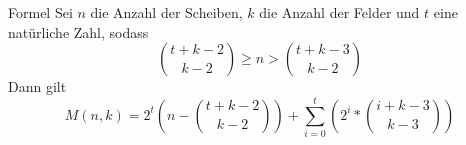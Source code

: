 \begin{frame}{Formel}
    Sei $n$ die Anzahl der Scheiben, $k$ die Anzahl der Felder und $t$ eine natürliche Zahl, sodass
    \[\binom{t+k-2}{k-2}\geq n>\binom{t+k-3}{k-2}\]
    Dann gilt
    \[M(n,k)=2^t\left(n-\binom{t+k-2}{k-2}\right)+\sum_{i=0}^{t}\left(2^i*\binom{i+k-3}{k-3}\right)\]
\end{frame}